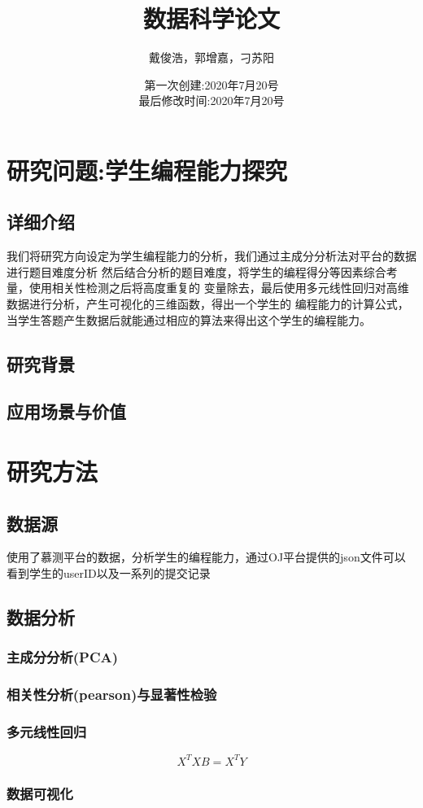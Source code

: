 \documentclass[a4paper]{ctexart}
\title{数据科学论文}
\author{\small 戴俊浩，郭增嘉，刁苏阳}
\date{\small 第一次创建:2020年7月20号\\最后修改时间:2020年7月20号}
\begin{document}
\ttfamily \songti
{}
\maketitle
\section{研究问题:学生编程能力探究}
\subsection{详细介绍}
我们将研究方向设定为学生编程能力的分析，我们通过主成分分析法对平台的数据进行题目难度分析
然后结合分析的题目难度，将学生的编程得分等因素综合考量，使用相关性检测之后将高度重复的
变量除去，最后使用多元线性回归对高维数据进行分析，产生可视化的三维函数，得出一个学生的
编程能力的计算公式，当学生答题产生数据后就能通过相应的算法来得出这个学生的编程能力。
\subsection{研究背景}
\subsection{应用场景与价值}
\section{研究方法}
\subsection{数据源}
使用了慕测平台的数据，分析学生的编程能力，通过OJ平台提供的json文件可以看到学生的userID以及一系列的提交记录
\subsection{数据分析}
\subsubsection{主成分分析(PCA)}
\subsubsection{相关性分析(pearson)与显著性检验}
\subsubsection{多元线性回归}
$$X^TXB=X^TY$$
\subsubsection{数据可视化}
\end{document}
